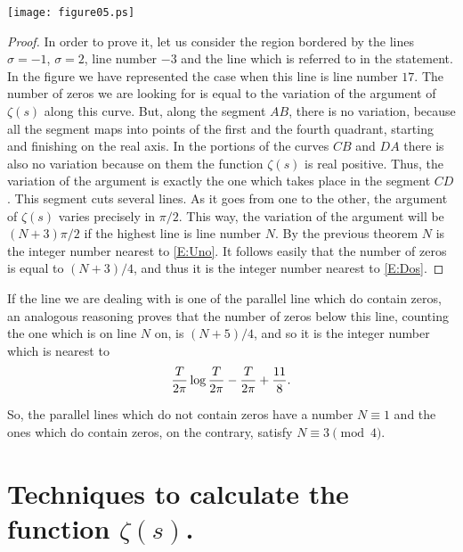 \documentclass[a4paper]{amsart}
\numberwithin{equation}{section}
\begin{document}
\begin{large}
\begin{minipage}{4cm}
\hspace{-0.8cm}
\texttt{[image: figure05.ps]}
\ \vspace{0.5cm}  \  
\end{minipage}
\hfill
\begin{minipage}{7.6cm}
\begin{proof}[Proof]
    In order to prove it, let us consider the region
bordered by the lines $\sigma=-1$, $\sigma=2$, line number $-3$ and
the line which is referred to in the statement. In the figure we
have represented the case when this line is line number $17$. The
number of zeros we are looking for is equal to the variation of
the argument of $\zeta(s)$ along this curve. But, along the
segment $AB$, there is no variation, because all the segment maps
into points of the first and the fourth quadrant, starting and
finishing on the real axis. In the portions of the curves $CB$ and
$DA$ there is also no variation because on them the function $\zeta(s)$ 
 is real positive. Thus, the variation of the argument is exactly the
one which takes place in the segment $CD$. This segment cuts
several lines. As it goes from one to the other, the argument of
$\zeta(s)$ varies precisely in $\pi/2$. This way, the variation of
the argument will be $(N + 3)\pi/2$ if the highest line is line
number $N$. By the previous theorem $N$ is the integer number
nearest to \ref{E:Uno}. It follows easily that the number of zeros is
equal to $(N + 3)/4$, and thus it is the integer number nearest to
\ref{E:Dos}.
\end{proof}

If the line we are dealing with is one of the parallel line which do contain
zeros, an analogous reasoning proves that the number of zeros below this line,
counting the one which is on line $N$ on, is $(N + 5)/4$, and so it is the
integer number which is nearest to
\begin{equation}
{T\over2\pi}\log{ T\over 2\pi}-{T\over 2\pi}+{11\over8}.
\end{equation}
\vfill
\end{minipage}
\noindent 
So, the parallel lines which do not contain zeros have a number
$N\equiv 1$ 
and the ones which do contain zeros, on the contrary, satisfy
$N\equiv 3\pmod{4}$.
\goodbreak



\section{Techniques to calculate the function $\zeta(s)$.}


\end{large}
\end{document}
